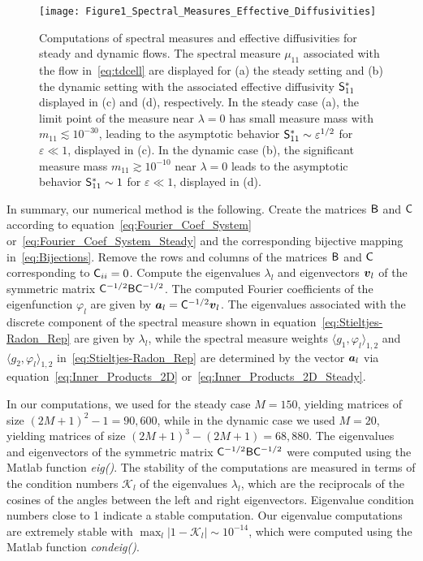 \documentclass[amsa]{ipart}
\begin{document}
%
\begin{figure}[t]
  \centerline{\texttt{[image: Figure1\_Spectral\_Measures\_Effective\_Diffusivities]}} 
\caption{%
  Computations of spectral measures and effective diffusivities for
  steady and dynamic flows. The spectral measure $\mu_{11}$ associated
  with the flow in~\eqref{eq:tdcell} are displayed for (a) the steady
  setting and (b) the dynamic setting with the associated effective
  diffusivity $\mathsf{S}^*_{11}$ displayed in (c) and (d), respectively. In
  the steady case (a), the 
  limit point of the measure near $\lambda=0$ has small measure mass with
  $m_{11}\lesssim10^{-30}$, leading to the asymptotic behavior
  $\mathsf{S}^*_{11}\sim\varepsilon^{1/2}$ for $\varepsilon\ll1$, displayed in (c). In the dynamic case
  (b), the significant measure mass $m_{11}\gtrsim10^{-10}$
  near $\lambda=0$ leads to the asymptotic behavior
  $\mathsf{S}^*_{11}\sim1$ for $\varepsilon\ll1$, displayed in (d).
        }
\label{fig:Fig1_Spect_Meas_Eff_Diffus}
\end{figure}
%


In summary, our numerical method is the following. Create the matrices
$\mathsf{B}$ and $\mathsf{C}$ according to equation~\eqref{eq:Fourier_Coef_System}
or~\eqref{eq:Fourier_Coef_System_Steady} and the corresponding
bijective mapping in~\eqref{eq:Bijections}. Remove the rows
and columns of the matrices $\mathsf{B}$ and $\mathsf{C}$ corresponding to
$\mathsf{C}_{ii}=0$. Compute the eigenvalues $\lambda_l$ and eigenvectors $\boldsymbol{v}_l$ of
the symmetric matrix $\mathsf{C}^{-1/2}\mathsf{B}\mathsf{C}^{-1/2}$. The computed Fourier
coefficients of the eigenfunction $\varphi_l$ are given by
$\boldsymbol{a}_l=\mathsf{C}^{-1/2}\boldsymbol{v}_l$. The eigenvalues associated with the
discrete component of the spectral measure shown in
equation~\eqref{eq:Stieltjes-Radon_Rep} are given by $\lambda_l$, while the
spectral measure weights $\langle g_1,\varphi_l\rangle_{1,2}$ and $\langle g_2,\varphi_l\rangle_{1,2}$
in~\eqref{eq:Stieltjes-Radon_Rep} are determined by the vector
$\boldsymbol{a}_l$ via equation~\eqref{eq:Inner_Products_2D}
or~\eqref{eq:Inner_Products_2D_Steady}.     



In our computations, we used for the steady case $M=150$, yielding
matrices of size $(2M+1)^2-1=90,600$, while in the dynamic case we used
$M=20$, yielding matrices of size $(2M+1)^3-(2M+1)=68,880$. The
eigenvalues and eigenvectors of the symmetric matrix
$\mathsf{C}^{-1/2}\mathsf{B}\mathsf{C}^{-1/2}$ were computed using the Matlab function
\emph{eig()}. The stability of the computations are measured in terms
of the condition numbers $\mathcal{K}_l$ of the eigenvalues $\lambda_l$,
which are the reciprocals of the cosines of the angles between the
left and right eigenvectors. Eigenvalue condition numbers close to 1
indicate a stable computation. Our eigenvalue computations are
extremely stable with $\max_l|1-\mathcal{K}_l|\sim10^{-14}$, which were
computed using the Matlab function \emph{condeig()}.
\end{document}
